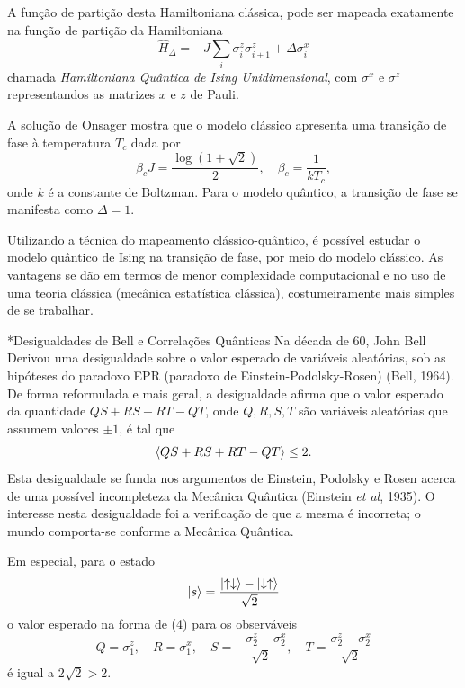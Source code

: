\documentclass[plainsections,32pt]{sciposter}
\makeatletter
\newcommand{\largo}{\fontsize{36}{40}\selectfont }
\renewcommand\section{\@startsection {section}{1}{\z@}{-1ex \@plus -0.5ex \@minus -.1ex}{0.8ex \@plus.1ex}{\largo\bfseries\fontsize{28}{26}\selectfont}}
\makeatother
\begin{document}
\begin{multicols}{2}
A função de partição desta Hamiltoniana clássica, pode ser mapeada exatamente na função de partição da Hamiltoniana
\begin{equation}
  \hat{H}_{\Delta} = -J\sum_i \sigma_{i}^z \sigma_{i+1}^z + \Delta \sigma_i^x
\end{equation}
chamada \textit{Hamiltoniana Quântica de Ising Unidimensional}, com $\sigma^x$ e $\sigma^z$ representandos as matrizes $x$ e $z$ de Pauli.

A solução de Onsager mostra que o modelo clássico apresenta uma transição de fase à temperatura $T_c$ dada por
\begin{equation}
  \beta_c J = \frac{\log(1 + \sqrt{2})}{2}
  , \quad \beta_c = \frac{1}{kT_c},
\end{equation}
onde $k$ é a constante de Boltzman. Para o modelo quântico, a transição de fase se manifesta como $\Delta = 1$.

Utilizando a técnica do mapeamento clássico-quântico, é possível estudar o modelo quântico de Ising na transição de fase, por meio do modelo clássico. As vantagens se dão em termos de menor complexidade computacional e no uso de uma teoria clássica (mecânica estatística clássica), costumeiramente mais simples de se trabalhar.

\section*{Desigualdades de Bell e Correlações Quânticas}
Na década de 60, John Bell Derivou uma desigualdade sobre o valor esperado de variáveis aleatórias, sob as hipóteses do paradoxo EPR (paradoxo de Einstein-Podolsky-Rosen) (Bell, 1964). De forma reformulada e mais geral, a desigualdade afirma que o valor esperado da quantidade $QS + RS + RT - QT$, onde $Q, R, S, T$ são variáveis aleatórias que assumem valores $\pm 1$, é tal que
\begin{equation}
  \braket{QS + RS + RT - QT} \leq 2.
\end{equation}
Esta desigualdade se funda nos argumentos de Einstein, Podolsky  e Rosen acerca de uma possível incompleteza da Mecânica Quântica (Einstein \textit{et al}, 1935). O interesse nesta desigualdade foi a verificação de que a mesma é incorreta; o mundo comporta-se conforme a Mecânica Quântica.

Em especial, para o estado
\begin{equation*}
  \ket{s} = \frac{\ket{\uparrow \downarrow} - \ket{\downarrow \uparrow}}{\sqrt{2}}
\end{equation*}
o valor esperado na forma de (4) para os observáveis
\begin{equation}
  Q = \sigma_1^z, \quad R = \sigma_1^x, \quad S =  \frac{-\sigma_2^z - \sigma_2^x}{\sqrt{2}}, \quad T =  \frac{\sigma_2^z - \sigma_2^x}{\sqrt{2}}
\end{equation}
é igual a $2\sqrt{2} > 2$.


\end{multicols}
\end{document}
